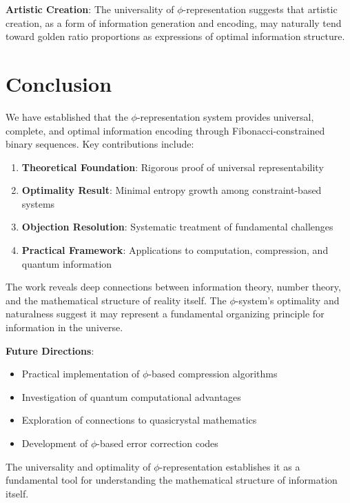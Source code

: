 \documentclass[12pt,letterpaper]{article}
\begin{document}
\textbf{Artistic Creation}: The universality of $\phi$-representation suggests that artistic creation, as a form of information generation and encoding, may naturally tend toward golden ratio proportions as expressions of optimal information structure.

\section{Conclusion}

We have established that the $\phi$-representation system provides universal, complete, and optimal information encoding through Fibonacci-constrained binary sequences. Key contributions include:

\begin{enumerate}
\item \textbf{Theoretical Foundation}: Rigorous proof of universal representability
\item \textbf{Optimality Result}: Minimal entropy growth among constraint-based systems  
\item \textbf{Objection Resolution}: Systematic treatment of fundamental challenges
\item \textbf{Practical Framework}: Applications to computation, compression, and quantum information
\end{enumerate}

The work reveals deep connections between information theory, number theory, and the mathematical structure of reality itself. The $\phi$-system's optimality and naturalness suggest it may represent a fundamental organizing principle for information in the universe.

\textbf{Future Directions}:
\begin{itemize}
\item Practical implementation of $\phi$-based compression algorithms
\item Investigation of quantum computational advantages
\item Exploration of connections to quasicrystal mathematics
\item Development of $\phi$-based error correction codes
\end{itemize}

The universality and optimality of $\phi$-representation establishes it as a fundamental tool for understanding the mathematical structure of information itself.



\end{document}
